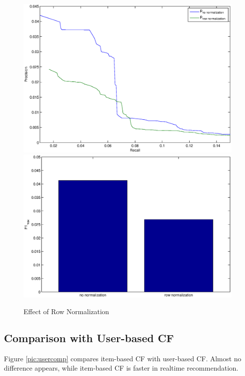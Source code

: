 \documentclass[11pt,a4paper,titlepage]{article}
\begin{document}
\begin{figure}[!h]
\includegraphics[width=\linewidth]{./row_norm.eps}
\includegraphics[width=\linewidth]{./row_norm_f1.eps}
\caption{Effect of Row Normalization}
\label{pic:rownorm}
\end{figure}


\subsection{Comparison with User-based CF}

Figure \ref{pic:usercomp} compares item-based CF with user-based CF. Almost no difference appears, while item-based CF is faster in realtime recommendation.
\end{document}
